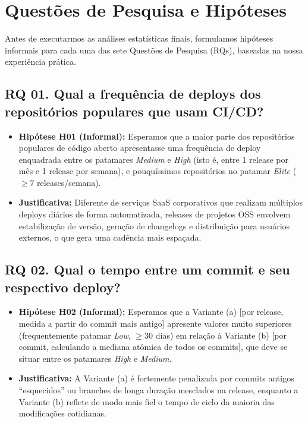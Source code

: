 \documentclass[12pt]{article}
\begin{document}
\section{Questões de Pesquisa e Hipóteses}

Antes de executarmos as análises estatísticas finais, formulamos hipóteses informais para cada uma das sete Questões de Pesquisa (RQs), baseadas na nossa experiência prática.

\subsection{RQ 01. Qual a frequência de deploys dos repositórios populares que usam CI/CD?}
\begin{itemize}
    \item \textbf{Hipótese H01 (Informal):} Esperamos que a maior parte dos repositórios populares de código aberto apresentasse uma frequência de deploy enquadrada entre os patamares \textit{Medium} e \textit{High} (isto é, entre 1 release por mês e 1 release por semana), e pouquíssimos repositórios no patamar \textit{Elite} ($\ge 7$ releases/semana).
    \item \textbf{Justificativa:} Diferente de serviços SaaS corporativos que realizam múltiplos deploys diários de forma automatizada, releases de projetos OSS envolvem estabilização de versão, geração de changelogs e distribuição para usuários externos, o que gera uma cadência mais espaçada.
\end{itemize}

\subsection{RQ 02. Qual o tempo entre um commit e seu respectivo deploy?}
\begin{itemize}
    \item \textbf{Hipótese H02 (Informal):} Esperamos que a Variante (a) [por release, medida a partir do commit mais antigo] apresente valores muito superiores (frequentemente patamar \textit{Low}, $\ge 30$ dias) em relação à Variante (b) [por commit, calculando a mediana atômica de todos os commits], que deve se situar entre os patamares \textit{High} e \textit{Medium}.
    \item \textbf{Justificativa:} A Variante (a) é fortemente penalizada por commits antigos ``esquecidos'' ou branches de longa duração mesclados na release, enquanto a Variante (b) reflete de modo mais fiel o tempo de ciclo da maioria das modificações cotidianas.
\end{itemize}
\end{document}
